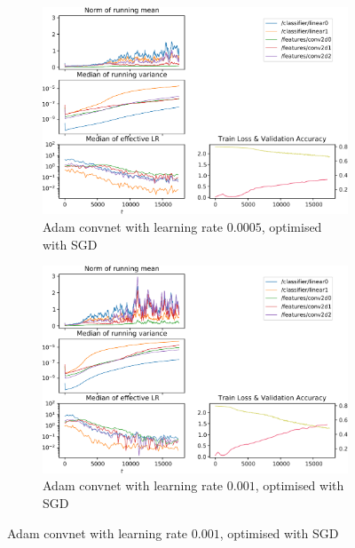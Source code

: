 \begin{figure}
    \begin{subfigure}{\textwidth}
        \centering
        \includegraphics[width=\linewidth]{gfx/diagrams/experiments/adam/adammodel_sgd_00005_0_-1.pdf}
        \caption{Adam convnet with learning rate $0.0005$, optimised with SGD}
    \end{subfigure}

    \begin{subfigure}{\textwidth}
        \centering
        \includegraphics[width=\linewidth]{gfx/diagrams/experiments/adam/adammodel_sgd_0001_0_-1.pdf}
        \caption{Adam convnet with learning rate $0.001$, optimised with SGD}
    \end{subfigure}


\end{figure}
